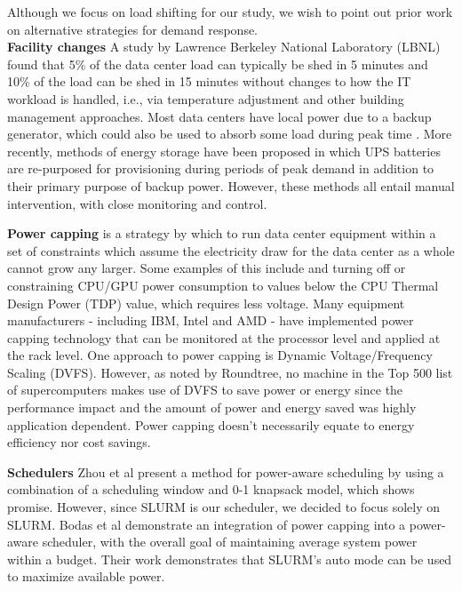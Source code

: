 Although we focus on load shifting for our study, we wish to point out prior work on alternative strategies for demand response. \\

\textbf{Facility changes} A study by Lawrence Berkeley National Laboratory (LBNL) found that 5\% of the data center load can typically be shed in 5 minutes and 10\% of the load can be shed in 15 minutes without changes to how the IT workload is handled, i.e., via temperature adjustment and other building management approaches\cite{Ghatikar2012}. Most data centers have local power due to a backup generator, which could also be used to absorb some load during peak time \cite{Liu2013}. More recently, methods of energy storage have been proposed\cite{Narayanan2014} in which UPS batteries are re-purposed for provisioning during periods of peak demand in addition to their primary purpose of backup power. However, these methods all entail manual intervention, with close monitoring and control.

\textbf{Power capping} is a strategy by which to run data center equipment within a set of constraints which assume the electricity draw for the data center as a whole cannot grow any larger. Some examples of this include and turning off or constraining CPU/GPU power consumption to values below the CPU Thermal Design Power (TDP) value, which requires less voltage. Many equipment manufacturers - including IBM, Intel and AMD - have implemented power capping technology that can be monitored at the processor level and applied at the rack level. One approach to power capping is Dynamic Voltage/Frequency Scaling (DVFS). However, as noted by Roundtree\cite{Roundtree2012}, no machine in the Top 500 list of supercomputers makes use of DVFS to save power or energy since the performance impact and the amount of power and energy saved was highly application dependent. Power capping doesn’t necessarily equate to energy efficiency nor cost savings.

\textbf{Schedulers} Zhou et al\cite{Zhou2014} present a method for power-aware scheduling by using a combination of a scheduling window and 0-1 knapsack model, which shows promise. However, since SLURM is our scheduler, we decided to focus solely on SLURM. Bodas et al\cite{Bodas2014} demonstrate an integration of power capping into a power-aware scheduler, with the overall goal of maintaining average system power within a budget. Their work demonstrates that SLURM’s auto mode can be used to maximize available power.  

